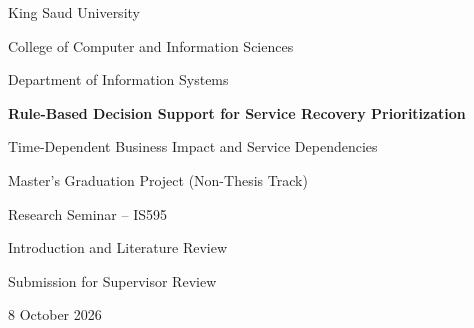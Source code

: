 \documentclass[12pt,a4paper,oneside]{report}
\begin{document}
\begin{titlepage}
\centering
\vspace*{1cm}
{\large King Saud University\par}
\vspace{0.3cm}
{\large College of Computer and Information Sciences\par}
\vspace{0.3cm}
{\large Department of Information Systems\par}
\vfill
{\LARGE\bfseries Rule-Based Decision Support for Service Recovery Prioritization\par}
\vspace{0.7cm}
{\large Time-Dependent Business Impact and Service Dependencies\par}
\vspace{1.3cm}
{\large Master's Graduation Project (Non-Thesis Track)\par}
\vspace{0.4cm}
{\large Research Seminar -- IS595\par}
\vfill
{\Large Introduction and Literature Review\par}
\vspace{0.4cm}
{\large Submission for Supervisor Review\par}
\vspace{1cm}
{\large 8 October 2026\par}
\end{titlepage}
\singlespacing
\setcounter{tocdepth}{2}
\tableofcontents
\clearpage
{}
\doublespacing


\clearpage
\singlespacing
{}
{}


\end{document}
